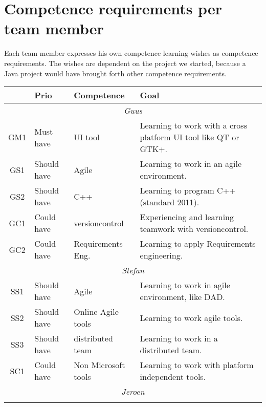 \section{Competence requirements per team member}

Each team member expresses his own competence learning wishes as
competence requirements. The wishes are dependent on the project we started,
because a Java project would have brought forth other competence requirements.

\begin{center}
    \begin{tabular}{cllp{17em}}
        \hline
        & {\bf Prio} & {\bf Competence}    & {\bf Goal}\\
        \hline
        \multicolumn{4}{c}{\sf\emph{Guus}}\\
        \hline
        GM1 & Must have    & UI tool             & Learning to work with a cross platform UI tool like QT or GTK+.\\
        GS1 & Should have  & Agile		   & Learning to work in an agile environment.\\
        GS2 & Should have  & C++		   & Learning to program C++ (standard 2011).\\
	GC1 & Could have   & versioncontrol	   & Experiencing and learning teamwork with versioncontrol.\\
        GC2 & Could have   & Requirements Eng.   & Learning to apply Requirements engineering.\\
        \hline
        \multicolumn{4}{c}{\sf\emph{Stefan}}\\
        \hline
        SS1 & Should have  & Agile		   & Learning to work in agile environment, like DAD.\\
        SS2 & Should have  & Online Agile tools  & Learning to work agile tools.\\
        SS3 & Should have  & distributed team    & Learning to work in a distributed team.\\
        SC1 & Could have   & Non Microsoft tools & Learning to work with platform independent tools.\\
        \hline
        \multicolumn{4}{c}{\sf\emph{Jeroen}}\\
        \hline
                     &                     & \\
        \hline
    \end{tabular}
    \label{tab: team-competence-req}
\end{center}
